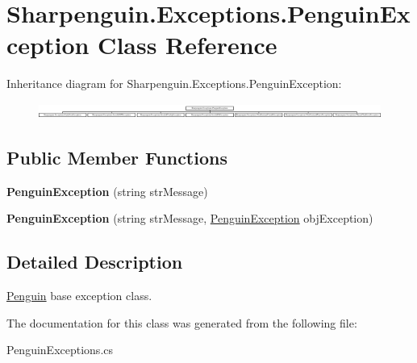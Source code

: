 \hypertarget{classSharpenguin_1_1Exceptions_1_1PenguinException}{\section{Sharpenguin.\-Exceptions.\-Penguin\-Exception Class Reference}
\label{classSharpenguin_1_1Exceptions_1_1PenguinException}
}
Inheritance diagram for Sharpenguin.\-Exceptions.\-Penguin\-Exception\-:\begin{figure}[H]
\begin{center}
\leavevmode
\includegraphics[height=0.501567cm]{classSharpenguin_1_1Exceptions_1_1PenguinException}
\end{center}
\end{figure}
\subsection*{Public Member Functions}
\begin{DoxyCompactItemize}
\item 
\hypertarget{classSharpenguin_1_1Exceptions_1_1PenguinException_a871080c38a4495954b949a98e8f1607a}{{\bfseries Penguin\-Exception} (string str\-Message)}\label{classSharpenguin_1_1Exceptions_1_1PenguinException_a871080c38a4495954b949a98e8f1607a}

\item 
\hypertarget{classSharpenguin_1_1Exceptions_1_1PenguinException_ae22f86a910bc8ee138a0d3f7b9f724cc}{{\bfseries Penguin\-Exception} (string str\-Message, \hyperlink{classSharpenguin_1_1Exceptions_1_1PenguinException}{Penguin\-Exception} obj\-Exception)}\label{classSharpenguin_1_1Exceptions_1_1PenguinException_ae22f86a910bc8ee138a0d3f7b9f724cc}

\end{DoxyCompactItemize}


\subsection{Detailed Description}
\hyperlink{classSharpenguin_1_1Penguin}{Penguin} base exception class. 

The documentation for this class was generated from the following file\-:\begin{DoxyCompactItemize}
\item 
Penguin\-Exceptions.\-cs\end{DoxyCompactItemize}
